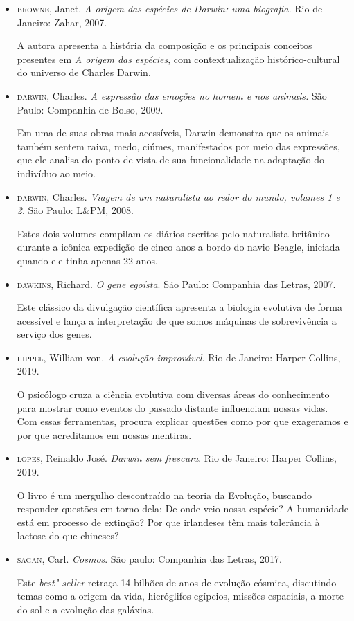 \documentclass[11pt]{extarticle}
\begin{document}
\begin{itemize}
\item \textsc{browne}, Janet. \emph{A origem das espécies de Darwin: uma biografia.}  Rio de
Janeiro: Zahar, 2007.

A autora apresenta a história da composição e os principais conceitos
presentes em \emph{A origem das espécies}, com contextualização
histórico-cultural do universo de Charles Darwin.

\item \textsc{darwin}, Charles. \emph{A expressão das emoções no homem e nos animais.} São
Paulo: Companhia de Bolso, 2009.

Em uma de suas obras mais acessíveis, Darwin demonstra que os animais também
sentem raiva, medo, ciúmes, manifestados por meio das expressões, que ele
analisa do ponto de vista de sua funcionalidade na adaptação do indivíduo ao
meio.

\item \textsc{darwin}, Charles. \emph{Viagem de um naturalista ao redor do mundo, volumes
1 e 2}. São Paulo: L\&PM, 2008.

Estes dois volumes compilam os diários escritos pelo naturalista britânico
durante a icônica expedição de cinco anos a bordo do navio Beagle, iniciada
quando ele tinha apenas 22 anos.


\item \textsc{dawkins}, Richard. \emph{O gene egoísta}. São Paulo: Companhia das Letras,
2007.

Este clássico da divulgação científica apresenta a biologia evolutiva de forma
acessível e lança a interpretação de que somos máquinas de sobrevivência
a serviço dos genes.

\item \textsc{hippel}, William von. \emph{A evolução improvável}. Rio de Janeiro: Harper
Collins, 2019.

O psicólogo cruza a ciência evolutiva com diversas áreas do conhecimento para
mostrar como eventos do passado distante influenciam nossas vidas.  Com essas
ferramentas, procura explicar questões como por que exageramos e por que
acreditamos em nossas mentiras.

\item \textsc{lopes}, Reinaldo José. \emph{Darwin sem frescura}. Rio de Janeiro: Harper
Collins, 2019.

O livro é um mergulho descontraído na teoria da Evolução, buscando responder
questões em torno dela: De onde veio nossa espécie? A humanidade está em
processo de extinção? Por que irlandeses têm mais tolerância à lactose do que
chineses?

\item \textsc{sagan}, Carl. \emph{Cosmos}. São paulo: Companhia das Letras, 2017.

Este \textit{best"-seller} retraça 14 bilhões de anos de evolução cósmica, discutindo
temas como a origem da vida, hieróglifos egípcios, missões espaciais, a morte
do sol e a evolução das galáxias.
\end{itemize}
\end{document}
